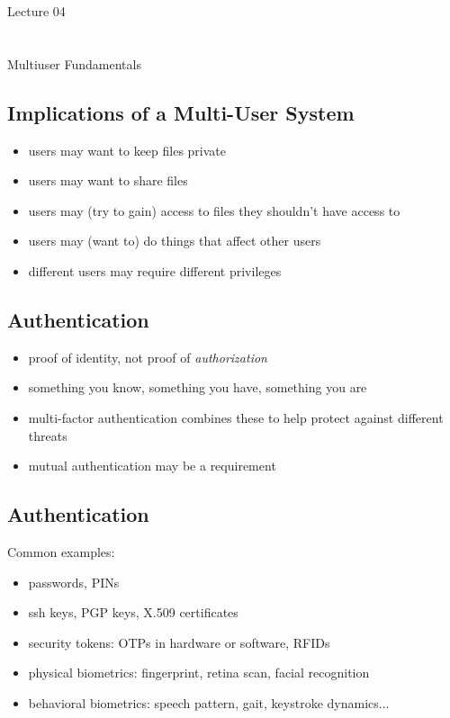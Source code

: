 \documentclass[xga]{xdvislides}
\begin{document}
\newpage
\vspace*{\fill}
\begin{center}
    \Hugesize
        Lecture 04 \\ [1em]
    \hspace*{5mm}
    \blueline\\
    \hspace*{5mm}\\
	Multiuser Fundamentals
\end{center}
\vspace*{\fill}

\subsection{Implications of a Multi-User System}
\begin{itemize}
	\item users may want to keep files private
	\item users may want to share files
	\item users may (try to gain) access to files they shouldn't have access to
	\item users may (want to) do things that affect other users
	\item different users may require different privileges
\end{itemize}

\subsection{Authentication}

\begin{itemize}
	\item proof of identity, not proof of {\em authorization}
	\item something you know, something you have, something you are
	\item multi-factor authentication combines these to help protect against different threats
	\item mutual authentication may be a requirement
\end{itemize}

\subsection{Authentication}
Common examples:
\begin{itemize}
	\item passwords, PINs
	\item ssh keys, PGP keys, X.509 certificates
	\item security tokens: OTPs in hardware or software, RFIDs
	\item physical biometrics: fingerprint, retina scan, facial recognition
	\item behavioral biometrics: speech pattern, gait, keystroke dynamics...
\end{itemize}
\vspace{.5in}
\end{document}
